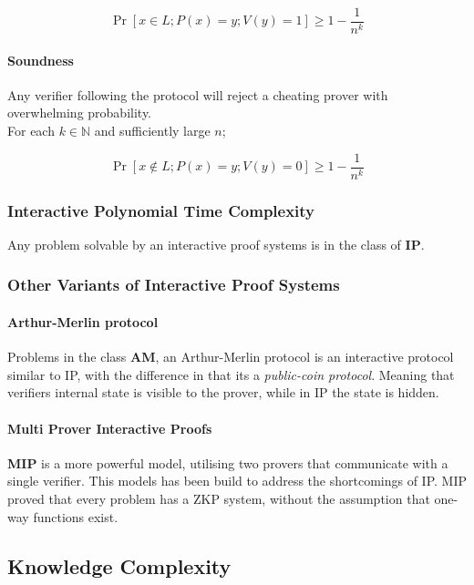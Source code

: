 $$\Pr[x \in L; P(x) = y; V(y) = 1] \ge 1 - \frac{1}{n^k}$$

\paragraph{Soundness}

Any verifier following the protocol will reject a cheating prover with overwhelming probability.\\
For each $k \in \mathbb{N}$ and sufficiently large $n$;

$$\Pr[x \notin L; P(x) = y; V(y) = 0] \ge 1 - \frac{1}{n^k}$$


\subsubsection{Interactive Polynomial Time Complexity}
Any problem solvable by an interactive proof systems is in the class of \textbf{IP}.

\subsubsection{Other Variants of Interactive Proof Systems}

\paragraph{Arthur-Merlin protocol} Problems in the class \textbf{AM}, an Arthur-Merlin protocol \cite{babai1985trading} is an interactive protocol similar to IP, with the difference in that its a \textit{public-coin protocol}. 
Meaning that verifiers internal state is visible to the prover, while in IP the state is hidden.

\paragraph{Multi Prover Interactive Proofs}
\textbf{MIP} \cite{ben2019multi} is a more powerful model, utilising two provers that communicate with a single verifier.
This models has been build to address the shortcomings of IP.
MIP proved that every problem has a ZKP system, without the assumption that one-way functions exist.

\subsection{Knowledge Complexity}

